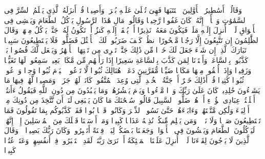 \stopbuffer
\startbuffer[\q:25:5]
وَقَالُوۤا۟ أَسَٰطِیرُ ٱلۡأَوَّلِینَ ٱكۡتَتَبَهَا فَهِیَ تُمۡلَىٰ عَلَیۡهِ بُكۡرَةࣰ وَأَصِیلࣰا%
\stopbuffer
\startbuffer[\q:25:6]
قُلۡ أَنزَلَهُ ٱلَّذِی یَعۡلَمُ ٱلسِّرَّ فِی ٱلسَّمَٰوَٰتِ وَٱلۡأَرۡضِۚ إِنَّهُۥ كَانَ غَفُورࣰا رَّحِیمࣰا%
\stopbuffer
\startbuffer[\q:25:7]
وَقَالُوا۟ مَالِ هَٰذَا ٱلرَّسُولِ یَأۡكُلُ ٱلطَّعَامَ وَیَمۡشِی فِی ٱلۡأَسۡوَاقِ لَوۡلَاۤ أُنزِلَ إِلَیۡهِ مَلَكࣱ فَیَكُونَ مَعَهُۥ نَذِیرًا%
\stopbuffer
\startbuffer[\q:25:8]
أَوۡ یُلۡقَىٰۤ إِلَیۡهِ كَنزٌ أَوۡ تَكُونُ لَهُۥ جَنَّةࣱ یَأۡكُلُ مِنۡهَاۚ وَقَالَ ٱلظَّٰلِمُونَ إِن تَتَّبِعُونَ إِلَّا رَجُلࣰا مَّسۡحُورًا%
\stopbuffer
\startbuffer[\q:25:9]
ٱنظُرۡ كَیۡفَ ضَرَبُوا۟ لَكَ ٱلۡأَمۡثَٰلَ فَضَلُّوا۟ فَلَا یَسۡتَطِیعُونَ سَبِیلࣰا%
\stopbuffer
\startbuffer[\q:25:10]
تَبَارَكَ ٱلَّذِیۤ إِن شَاۤءَ جَعَلَ لَكَ خَیۡرࣰا مِّن ذَٰلِكَ جَنَّٰتࣲ تَجۡرِی مِن تَحۡتِهَا ٱلۡأَنۡهَٰرُ وَیَجۡعَل لَّكَ قُصُورَۢا%
\stopbuffer
\startbuffer[\q:25:11]
بَلۡ كَذَّبُوا۟ بِٱلسَّاعَةِۖ وَأَعۡتَدۡنَا لِمَن كَذَّبَ بِٱلسَّاعَةِ سَعِیرًا%
\stopbuffer
\startbuffer[\q:25:12]
إِذَا رَأَتۡهُم مِّن مَّكَانِۭ بَعِیدࣲ سَمِعُوا۟ لَهَا تَغَیُّظࣰا وَزَفِیرࣰا%
\stopbuffer
\startbuffer[\q:25:13]
وَإِذَاۤ أُلۡقُوا۟ مِنۡهَا مَكَانࣰا ضَیِّقࣰا مُّقَرَّنِینَ دَعَوۡا۟ هُنَالِكَ ثُبُورࣰا%
\stopbuffer
\startbuffer[\q:25:14]
لَّا تَدۡعُوا۟ ٱلۡیَوۡمَ ثُبُورࣰا وَٰحِدࣰا وَٱدۡعُوا۟ ثُبُورࣰا كَثِیرࣰا%
\stopbuffer
\startbuffer[\q:25:15]
قُلۡ أَذَٰلِكَ خَیۡرٌ أَمۡ جَنَّةُ ٱلۡخُلۡدِ ٱلَّتِی وُعِدَ ٱلۡمُتَّقُونَۚ كَانَتۡ لَهُمۡ جَزَاۤءࣰ وَمَصِیرࣰا%
\stopbuffer
\startbuffer[\q:25:16]
لَّهُمۡ فِیهَا مَا یَشَاۤءُونَ خَٰلِدِینَۚ كَانَ عَلَىٰ رَبِّكَ وَعۡدࣰا مَّسۡءُولࣰا%
\stopbuffer
\startbuffer[\q:25:17]
وَیَوۡمَ یَحۡشُرُهُمۡ وَمَا یَعۡبُدُونَ مِن دُونِ ٱللَّهِ فَیَقُولُ ءَأَنتُمۡ أَضۡلَلۡتُمۡ عِبَادِی هَٰۤؤُلَاۤءِ أَمۡ هُمۡ ضَلُّوا۟ ٱلسَّبِیلَ%
\stopbuffer
\startbuffer[\q:25:18]
قَالُوا۟ سُبۡحَٰنَكَ مَا كَانَ یَنۢبَغِی لَنَاۤ أَن نَّتَّخِذَ مِن دُونِكَ مِنۡ أَوۡلِیَاۤءَ وَلَٰكِن مَّتَّعۡتَهُمۡ وَءَابَاۤءَهُمۡ حَتَّىٰ نَسُوا۟ ٱلذِّكۡرَ وَكَانُوا۟ قَوۡمَۢا بُورࣰا%
\stopbuffer
\startbuffer[\q:25:19]
فَقَدۡ كَذَّبُوكُم بِمَا تَقُولُونَ فَمَا تَسۡتَطِیعُونَ صَرۡفࣰا وَلَا نَصۡرࣰاۚ وَمَن یَظۡلِم مِّنكُمۡ نُذِقۡهُ عَذَابࣰا كَبِیرࣰا%
\stopbuffer
\startbuffer[\q:25:20]
وَمَاۤ أَرۡسَلۡنَا قَبۡلَكَ مِنَ ٱلۡمُرۡسَلِینَ إِلَّاۤ إِنَّهُمۡ لَیَأۡكُلُونَ ٱلطَّعَامَ وَیَمۡشُونَ فِی ٱلۡأَسۡوَاقِۗ وَجَعَلۡنَا بَعۡضَكُمۡ لِبَعۡضࣲ فِتۡنَةً أَتَصۡبِرُونَۗ وَكَانَ رَبُّكَ بَصِیرࣰا%
\stopbuffer
\startbuffer[\q:25:21]
۞ وَقَالَ ٱلَّذِینَ لَا یَرۡجُونَ لِقَاۤءَنَا لَوۡلَاۤ أُنزِلَ عَلَیۡنَا ٱلۡمَلَٰۤئِكَةُ أَوۡ نَرَىٰ رَبَّنَاۗ لَقَدِ ٱسۡتَكۡبَرُوا۟ فِیۤ أَنفُسِهِمۡ وَعَتَوۡ عُتُوࣰّا كَبِیرࣰا%
